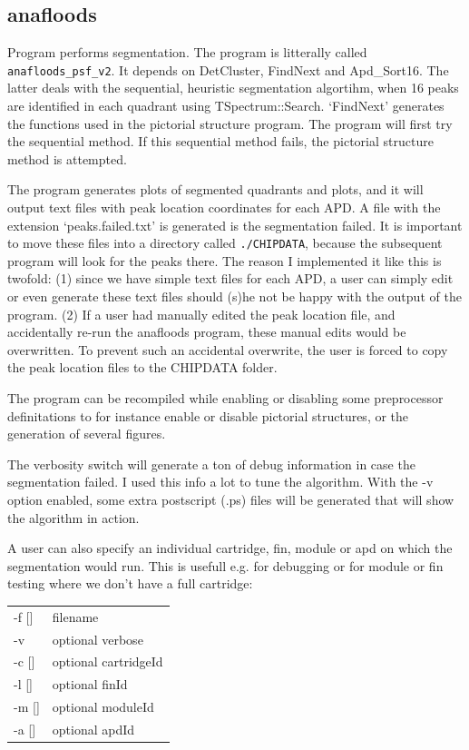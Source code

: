 \documentclass[12pt]{article}
\begin{document}
\subsection{anafloods}
Program performs segmentation. The program is litterally called {\tt anafloods\_psf\_v2}. It depends on DetCluster, FindNext and Apd\_Sort16. The latter deals with the sequential, heuristic segmentation algortihm, when 16 peaks are identified in each quadrant using TSpectrum::Search. `FindNext' generates the functions used in the pictorial structure program. The program will first try the sequential method. If this sequential method fails, the pictorial structure method is attempted.

The program generates plots of segmented quadrants and plots, and it will output text files with peak location coordinates for each APD. A file with the extension `peaks.failed.txt' is generated is the segmentation failed. It is important to move these files into a directory called {\tt ./CHIPDATA}, because the subsequent program will look for the peaks there. The reason I implemented it like this is twofold: (1) since we have simple text files for each APD, a user can simply edit or even generate these text files should (s)he not be happy with the output of the program. (2) If a user had manually edited the peak location file, and accidentally re-run the anafloods program, these manual edits would be overwritten. To prevent such an accidental overwrite, the user is forced to copy the peak location files to the CHIPDATA folder. 

The program can be recompiled while enabling or disabling some preprocessor definitations to for instance enable or disable pictorial structures, or the generation of several figures. 

The verbosity switch will generate a ton of debug information in case the segmentation failed. I used this info a lot to tune the algorithm. With the -v option enabled, some extra postscript (.ps) files will be generated that will show the algorithm in action. 

A user can also specify an individual cartridge, fin, module or apd on which the segmentation would run. This is usefull e.g. for debugging or for module or fin testing where we don't have a full cartridge:\\

\begin{tabular}{ll}
 -f [] & filename\\
 -v & optional verbose\\
 -c []& optional cartridgeId\\
 -l []& optional finId \\
 -m []& optional moduleId\\ 
  -a []& optional apdId\\
\end{tabular}
\end{document}
